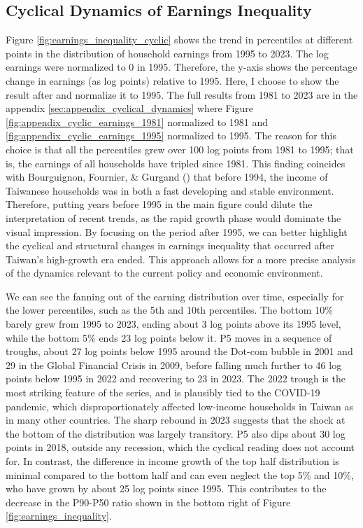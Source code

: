 \documentclass{article}
\begin{document}
\subsection{Cyclical Dynamics of Earnings Inequality}

Figure \ref{fig:earnings_inequality_cyclic} shows the trend in percentiles at different points in the distribution of household earnings from 1995 to 2023. The log earnings were normalized to 0 in 1995. Therefore, the y-axis shows the percentage change in earnings (as log points) relative to 1995.
Here, I choose to show the result after and normalize it to 1995. The full results from 1981 to 2023 are in the appendix \ref{sec:appendix_cyclical_dynamics} where Figure \ref{fig:appendix_cyclic_earnings_1981} normalized to 1981 and \ref{fig:appendix_cyclic_earnings_1995} normalized to 1995. 
The reason for this choice is that all the percentiles grew over 100 log points from 1981 to 1995; that is, the earnings of all households have tripled since 1981.
This finding coincides with Bourguignon, Fournier, \& Gurgand (\citeyear{TW_stable_dist}) that before 1994, the income of Taiwanese households was in both a fast developing and stable environment.
Therefore, putting years before 1995 in the main figure could dilute the interpretation of recent trends, as the rapid growth phase would dominate the visual impression. By focusing on the period after 1995, we can better highlight the cyclical and structural changes in earnings inequality that occurred after Taiwan's high-growth era ended. This approach allows for a more precise analysis of the dynamics relevant to the current policy and economic environment.

We can see the fanning out of the earning distribution over time, especially for the lower percentiles, such as the 5th and 10th percentiles. The bottom 10\% barely grew from 1995 to 2023, ending about 3 log points above its 1995 level, while the bottom 5\% ends 23 log points below it. P5 moves in a sequence of troughs, about 27 log points below 1995 around the Dot-com bubble in 2001 and 29 in the Global Financial Crisis in 2009, before falling much further to 46 log points below 1995 in 2022 and recovering to 23 in 2023. The 2022 trough is the most striking feature of the series, and is plausibly tied to the COVID-19 pandemic, which disproportionately affected low-income households in Taiwan as in many other countries. The sharp rebound in 2023 suggests that the shock at the bottom of the distribution was largely transitory. P5 also dips about 30 log points in 2018, outside any recession, which the cyclical reading does not account for.
In contrast, the difference in income growth of the top half distribution is minimal compared to the bottom half and can even neglect the top 5\% and 10\%, who have grown by about 25 log points since 1995. This contributes to the decrease in the P90-P50 ratio shown in the bottom right of Figure \ref{fig:earnings_inequality}.
\end{document}
